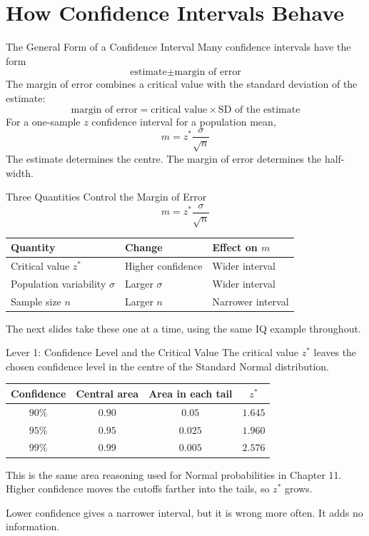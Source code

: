 \documentclass[aspectratio=169]{beamer}
\begin{document}
\section{How Confidence Intervals Behave}

\begin{frame}{The General Form of a Confidence Interval}
Many confidence intervals have the form
$$\text{estimate}\pm\text{margin of error}$$
The margin of error combines a critical value with the standard deviation of the estimate:
$$\text{margin of error}=\text{critical value}\times\text{SD of the estimate}$$
For a one-sample $z$ confidence interval for a population mean,
$$m=z^*\frac{\sigma}{\sqrt{n}}$$
The estimate determines the centre. The margin of error determines the half-width.
\end{frame}

\begin{frame}{Three Quantities Control the Margin of Error}
$$m=z^*\frac{\sigma}{\sqrt{n}}$$
\begin{center}
\begin{tabular}{lll}
\toprule
\textbf{Quantity} & \textbf{Change} & \textbf{Effect on $m$} \\
\midrule
Critical value $z^*$ & Higher confidence & Wider interval \\
Population variability $\sigma$ & Larger $\sigma$ & Wider interval \\
Sample size $n$ & Larger $n$ & Narrower interval \\
\bottomrule
\end{tabular}
\end{center}

\vspace{0.2cm}
The next slides take these one at a time, using the same IQ example throughout.
\end{frame}

\begin{frame}{Lever 1: Confidence Level and the Critical Value}
The critical value $z^*$ leaves the chosen confidence level in the centre of the Standard Normal distribution.
\begin{center}
\begin{tabular}{cccc}
\toprule
\textbf{Confidence} & \textbf{Central area} & \textbf{Area in each tail} & \textbf{$z^*$} \\
\midrule
$90\%$ & $0.90$ & $0.05$ & $1.645$ \\
$95\%$ & $0.95$ & $0.025$ & $1.960$ \\
$99\%$ & $0.99$ & $0.005$ & $2.576$ \\
\bottomrule
\end{tabular}
\end{center}
This is the same area reasoning used for Normal probabilities in Chapter 11. Higher confidence moves the cutoffs farther into the tails, so $z^*$ grows.

\vspace{0.1cm}
Lower confidence gives a narrower interval, but it is wrong more often. It adds no information.
\end{frame}
\end{document}
